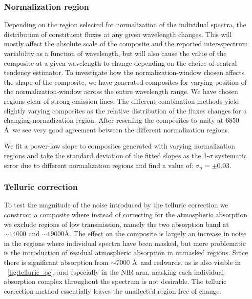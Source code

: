 \documentclass{aa}    %
\newcommand{\figref}[1]{\ref{fig:#1}}
\newcommand{\Fig}[1]{\figurename~\figref{#1}}
\newcommand{\fig}[1]{\Fig{#1}}
\newcommand{\sectlabel}[1]{\label{sect:#1}}
\begin{document}
\subsubsection{Normalization region}  \sectlabel{Normalisation region}
Depending on the region selected for normalization of the individual
spectra, the distribution of constituent fluxes at any given
wavelength changes. This will mostly affect the absolute scale of the
composite and the reported inter-spectrum variability as a function of
wavelength, but will also cause the value of the composite at a given
wavelength to change depending on the choice of central tendency
estimator. To investigate how the normalization-window chosen affects
the shape of the composite, we have generated composites for varying
position of the normalization-window across the entire wavelength
range. We have chosen regions clear of strong emission lines. The
different combination methods yield slightly varying composites as the
relative distribution of the fluxes changes for a changing
normalization region. After rescaling the composites to unity at 6850
\AA~we see very good agreement between the different normalization
regions.


 We fit a power-law slope to composites generated with varying normalization
regions and take the standard deviation of the fitted slopes as the 1-$\sigma$
systematic error due to different normalization regions and find a value of:
$\sigma_{n} = \pm 0.03$.



\subsubsection{Telluric correction}  \sectlabel{Telluric correction}
To test the magnitude of the noise introduced by the telluric correction we
construct a composite where instead of correcting for the atmospheric absorption
we exclude regions of low transmission, namely the two absorption band at $\sim
14000$ and $\sim 19000$\AA. The effect on the composite is largely an increase
in noise in the regions where individual spectra have been masked, but more
problematic is the introduction of residual atmospheric absorption in unmasked
regions. Since there is significant absorption from $\sim 7000$ \AA~and
redwards, as is also visible in \fig{telluric_qc}, and especially in the NIR
arm, masking each individual absorption complex throughout the spectrum is not
desirable. The telluric correction method essentially leaves the unaffected
region free of change. 
\end{document}
